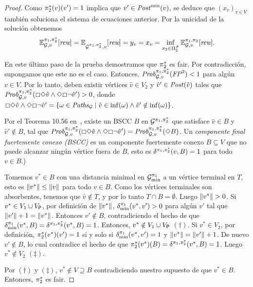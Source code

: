 \begin{proof}
  Como $\pi^*_{2}(v)(v') = 1$ implica que $v'\in\mathit{Post}^{\min}(v)$,
  se deduce que $(x_v)_{v\in V}$ también soluciona el sistema de ecuaciones anterior.  Por la unicidad de la solución obtenemos
  \[\mathbb{E}^{\pi_{1}, \pi^*_{2}}_{\mathcal{G},v}[\textit{rew}] = 
    \mathbb{E}^{}_{\mathcal{G}^{\pi_{1},\pi^*_{2}},v}[\textit{rew}] =
    y_v = x_v =
    \inf_{\pi_{2} \in \Pi^{\mathcal{F}}_{2}} \mathbb{E}^{\pi_{1}, \pi_{2}}_{\mathcal{G},v}[\textit{rew}].
  \]

  En este último paso de la prueba demostramos que $\pi^*_{2}$ es fair.
  Por contradicción, supongamos que este no es el caso.  Entonces,
  $\mathit{Prob}^{\pi_{1}, \pi^*_{2}}_{\mathcal{G},v}(\mathit{FP}^2) < 1$ para algún
  $v\in V$.  Por lo tanto, deben existir vértices $\hat{v}\in V_2$
  y $\hat{v}'\in\mathit{Post}(\hat{v})$ tales que 
  $\mathit{Prob}^{\pi_{1}, \pi^*_{2}}_{\mathcal{G},v}({\Box\Diamond\hat{v}}\land{\Diamond\Box\neg\hat{v}'})>0$,
  donde
  ${\Box\Diamond\hat{v}}\land{\Diamond\Box\neg\hat{v}'} =\{ {\omega\in\mathit{Paths}_{\mathcal{G}}} \mid {\hat{v} \in \inf(\omega)} \land {\hat{v}' \notin \inf(\omega)} \}$.

  Por el Teorema 10.56 en~\cite{BaierK08}, existe un BSCC
  $B$ en $\mathcal{G}^{\pi_{1},\pi^*_{2}}$ que satisface $\hat{v}\in
  B$ y $\hat{v}'\notin B$, tal que
  $\mathit{Prob}^{\pi_{1}, \pi^*_{2}}_{\mathcal{G},v}({\Box\Diamond\hat{v}}\land{\Diamond\Box\neg\hat{v}'})
  = \mathit{Prob}^{\pi_{1}, \pi^*_{2}}_{\mathcal{G},v}({\Diamond B})$.
%
  Un \emph{componente final fuertemente conexo (BSCC)} es un componente fuertemente conexo $B\subseteq V$ que no puede alcanzar ningún vértice fuera de $B$, esto es $\delta^{\pi_{1},\pi^*_{2}}(v,B)=1$
  para todo $v\in B$.)

  Tomemos $v^*\in B$ con una distancia minimal en
  $\mathcal{G}^{\pi_{1}}_{\min}$ a un vértice terminal en $T$, esto es
  ${\lVert{v^*}\rVert}\leq{\lVert{v}\rVert}$ para todo $v\in B$.  Como los vértices terminales son absorbentes, tenemos que $\hat{v}\notin T$, y por lo tanto
  $T\cap B=\emptyset$.  Luego ${\lVert{v^*}\rVert}>0$.
  Si $v^*\in V_1 \cup V_{\mathsf{P}}$, por definición de
  ${\lVert{v^*}\rVert}$, $\delta^{\pi_{1}}_{\min}(v^*,v')>0$
  para algún $v'$ tal que ${\lVert{v'}\rVert}+1={\lVert{v^*}\rVert}$. Entonces
  $v'\notin B$, contradiciendo el hecho de que
  $\delta^{\pi_{1}}_{\min}(v^*,B)=\delta^{\pi_{1},\pi^*_{2}}(v^*,B)=1$.
  Entonces, $v^*\notin V_1 \cup V_{\mathsf{P}}$ $(\dagger)$.
  Si $v^*\in V_2$, por definición,
  $\pi^*_{2}(v^*)(v')=1$ si y solo si
  $\delta^{\pi_{1}}_{\min}(v^*,v')=1$ y
  ${\lVert{v^*}\rVert}={\lVert{v'}\rVert}+1$. De nuevo $v'\notin B$, 
  lo cual contradice el hecho de que
  $\pi^*_{2}(v^*)(B)=\delta^{\pi_{1},\pi^*_{2}}(v^*,B)=1$.
  Luego $v^*\notin V_2$ $(\ddagger)$.
  
  Por $(\dagger)$ y $(\ddagger)$, $v^*\notin V \supseteq B$
  contradiciendo nuestro supuesto de que $v^*\in B$.  Entonces,
  $\pi^*_{2}$ es fair.
  \qedhere
\end{proof}
